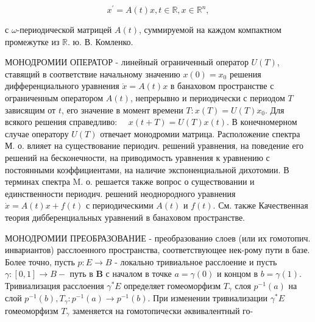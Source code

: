 \documentclass[10pt]{article}
\begin{document}
\[

x^{\prime}=A(t) x, t \in \mathbb{R}, x \in \mathbb{R}^{n},

\]



с $\omega$-периодической матрицей $A(t)$, суммируемой на каждом компактном промежутке из $\mathbb{R}$. ю. В. Комленко.



МОНОДРОМИИ ОПЕРАТОР - линейный ограниченный оператор $U(T)$, ставящий в соответствие начальному значению $x(0)=x_{0}$ решения дифференциального уравнения $\dot{x}=A(t) x$ в банаховом пространстве с ограниченным оператором $A(t)$, непрерывно и периодически с периодом $T$ зависящим от $t$, его значение в момент времени $T: x(T)=U(T) x_{0}$. Для всякого решения справедливо: $\quad x(t+T)=U(T) x(t)$. В конечномерном случае оператору $U(T)$ отвечает монодромии матрица. Расположение спектра М. о. влияет на существование периодич. решений уравнения, на поведение его решений на бесконечности, на приводимость уравнения к уравнению с постоянными коэффициентами, на наличие экспоненциальной дихотомии. В терминах спектра M. о. решается также вопрос о существовании и единственности периодич. решений неоднородного уравнения $\dot{x}=A(t) x+f(t)$ с периодическими $A(t)$ и $f(t)$. См. также Качественная теория дибберенциальных уравнений в банаховом пространстве.



МОНОДРОМИИ ПРЕОБРАЗОВАНИЕ - преобразованиө слоев (или их гомотопич. инвариантов) расслоенного пространства, соответствующее нек-рому пути в базе. Более точно, пусть $p: E \rightarrow B$ - локально тривиальное расслоение и пусть $\gamma:[0,1] \rightarrow B-$ путь в $\boldsymbol{B}$ с началом в точке $a=\gamma(0)$ и концом в $b=\gamma(1)$. Тривиализация расслоения $\gamma^{*} E$ определяет гомеоморфизм $T_{\gamma}$ слоя $p^{-1}(a)$ на слой $p^{-1}(b), T_{\gamma}: p^{-1}(a) \rightarrow p^{-1}(b)$. При изменении тривиализации $\gamma^{*} E$ гомеоморфизм $T_{\gamma}$ заменяется на гомотопически әквивалентный го-
\end{document}
